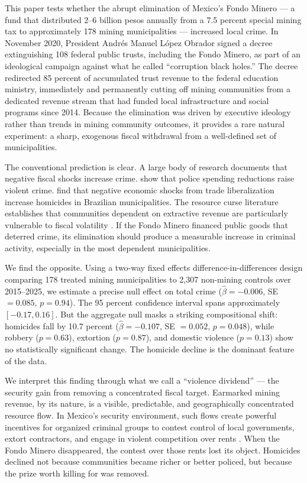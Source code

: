 \documentclass[12pt]{article}
\begin{document}
This paper tests whether the abrupt elimination of Mexico's Fondo Minero --- a fund that distributed 2--6 billion pesos annually from a 7.5 percent special mining tax to approximately 178 mining municipalities --- increased local crime. In November 2020, President Andr\'{e}s Manuel L\'{o}pez Obrador signed a decree extinguishing 108 federal public trusts, including the Fondo Minero, as part of an ideological campaign against what he called ``corruption black holes.'' The decree redirected 85 percent of accumulated trust revenue to the federal education ministry, immediately and permanently cutting off mining communities from a dedicated revenue stream that had funded local infrastructure and social programs since 2014. Because the elimination was driven by executive ideology rather than trends in mining community outcomes, it provides a rare natural experiment: a sharp, exogenous fiscal withdrawal from a well-defined set of municipalities.

The conventional prediction is clear. A large body of research documents that negative fiscal shocks increase crime. \citet{chalfin2022more} show that police spending reductions raise violent crime. \citet{dix2017demand} find that negative economic shocks from trade liberalization increase homicides in Brazilian municipalities. The resource curse literature establishes that communities dependent on extractive revenue are particularly vulnerable to fiscal volatility \citep{ross2015oil, bazzi2015commodity}. If the Fondo Minero financed public goods that deterred crime, its elimination should produce a measurable increase in criminal activity, especially in the most dependent municipalities.

We find the opposite. Using a two-way fixed effects difference-in-differences design comparing 178 treated mining municipalities to 2,307 non-mining controls over 2015--2025, we estimate a precise null effect on total crime ($\hat{\beta} = -0.006$, SE $= 0.085$, $p = 0.94$). The 95 percent confidence interval spans approximately $[-0.17, 0.16]$. But the aggregate null masks a striking compositional shift: homicides fall by 10.7 percent ($\hat{\beta} = -0.107$, SE $= 0.052$, $p = 0.048$), while robbery ($p = 0.63$), extortion ($p = 0.87$), and domestic violence ($p = 0.13$) show no statistically significant change. The homicide decline is the dominant feature of the data.

We interpret this finding through what we call a ``violence dividend'' --- the security gain from removing a concentrated fiscal target. Earmarked mining revenue, by its nature, is a visible, predictable, and geographically concentrated resource flow. In Mexico's security environment, such flows create powerful incentives for organized criminal groups to contest control of local governments, extort contractors, and engage in violent competition over rents \citep{dell2015trafficking, castilloberdejo2020organized}. When the Fondo Minero disappeared, the contest over those rents lost its object. Homicides declined not because communities became richer or better policed, but because the prize worth killing for was removed.
\end{document}
